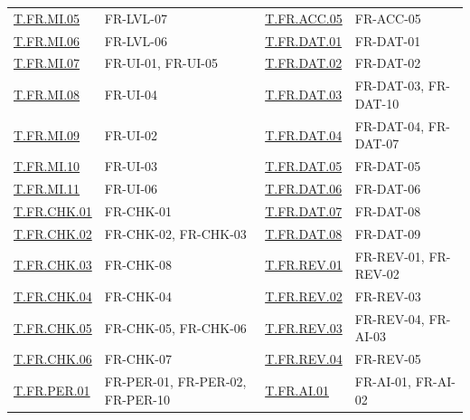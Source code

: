 \documentclass[12pt, titlepage]{article}
\begin{document}
\begin{table}[H]
\begin{tabularx}{\textwidth}{@{}p{}>{\raggedright\arraybackslash}X@{\hspace{1.5em}}p{}>{\raggedright\arraybackslash}X@{}}
\hyperlink{test-fr-mi-05}{T.FR.MI.05} & FR-LVL-07 & \hyperlink{test-fr-acc-05}{T.FR.ACC.05} & FR-ACC-05\\
\hyperlink{test-fr-mi-06}{T.FR.MI.06} & FR-LVL-06 & \hyperlink{test-fr-da01}{T.FR.DAT.01} & FR-DAT-01\\
\hyperlink{test-fr-mi-07}{T.FR.MI.07} & FR-UI-01, FR-UI-05 & \hyperlink{test-fr-da02}{T.FR.DAT.02} & FR-DAT-02\\
\hyperlink{test-fr-mi-08}{T.FR.MI.08} & FR-UI-04 & \hyperlink{test-fr-da03}{T.FR.DAT.03} & FR-DAT-03, FR-DAT-10\\
\hyperlink{test-fr-mi-09}{T.FR.MI.09} & FR-UI-02 & \hyperlink{test-fr-da04}{T.FR.DAT.04} & FR-DAT-04, FR-DAT-07\\
\hyperlink{test-fr-mi-10}{T.FR.MI.10} & FR-UI-03 & \hyperlink{test-fr-da05}{T.FR.DAT.05} & FR-DAT-05\\
\hyperlink{test-fr-mi-11}{T.FR.MI.11} & FR-UI-06 & \hyperlink{test-fr-da06}{T.FR.DAT.06} & FR-DAT-06\\
\hyperlink{test-fr-chk-01}{T.FR.CHK.01} & FR-CHK-01 & \hyperlink{test-fr-da07}{T.FR.DAT.07} & FR-DAT-08\\
\hyperlink{test-fr-chk-02}{T.FR.CHK.02} & FR-CHK-02, FR-CHK-03 & \hyperlink{test-fr-da08}{T.FR.DAT.08} & FR-DAT-09\\
\hyperlink{test-fr-chk-03}{T.FR.CHK.03} & FR-CHK-08 & \hyperlink{test-fr-rev-01}{T.FR.REV.01} & FR-REV-01, FR-REV-02\\
\hyperlink{test-fr-chk-04}{T.FR.CHK.04} & FR-CHK-04 & \hyperlink{test-fr-rev-02}{T.FR.REV.02} & FR-REV-03\\
\hyperlink{test-fr-chk-05}{T.FR.CHK.05} & FR-CHK-05, FR-CHK-06 & \hyperlink{test-fr-rev-03}{T.FR.REV.03} & FR-REV-04, FR-AI-03\\
\hyperlink{test-fr-chk-06}{T.FR.CHK.06} & FR-CHK-07 & \hyperlink{test-fr-rev-04}{T.FR.REV.04} & FR-REV-05\\
\hyperlink{test-fr-per-01}{T.FR.PER.01} & FR-PER-01, FR-PER-02, FR-PER-10 & \hyperlink{test-fr-ai-01}{T.FR.AI.01} & FR-AI-01, FR-AI-02\\
\bottomrule
\end{tabularx}
\end{table}
\end{document}

